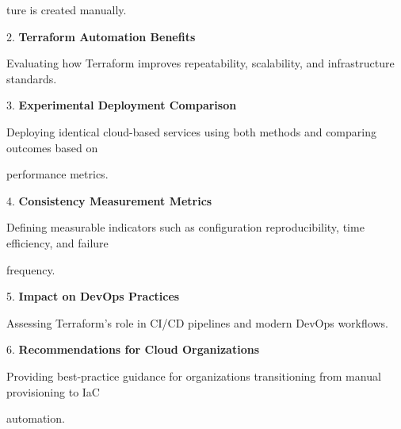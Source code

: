 \documentclass[10pt]{article}
\begin{document}
ture is created manually.

2. \textbf{Terraform Automation Benefits}

Evaluating how Terraform improves repeatability, scalability, and infrastructure standards.

3. \textbf{Experimental Deployment Comparison}

Deploying identical cloud-based services using both methods and comparing outcomes based on

performance metrics.

4. \textbf{Consistency Measurement Metrics}

Defining measurable indicators such as configuration reproducibility, time efficiency, and failure

frequency.

5. \textbf{Impact on DevOps Practices}

Assessing Terraform’s role in CI/CD pipelines and modern DevOps workflows.

6. \textbf{Recommendations for Cloud Organizations}

Providing best-practice guidance for organizations transitioning from manual provisioning to IaC

automation.

%

 
\end{document}
